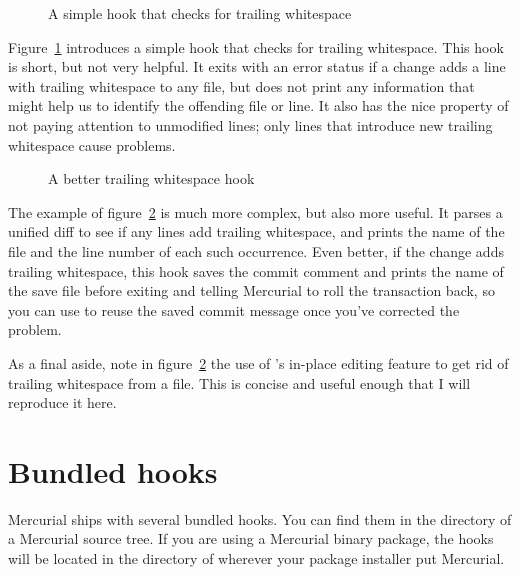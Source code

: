 \begin{figure}[ht]
  \caption{A simple hook that checks for trailing whitespace}
  \label{ex:hook:ws.simple}
\end{figure}

Figure~\ref{ex:hook:ws.simple} introduces a simple 
hook that checks for trailing whitespace.  This hook is short, but not
very helpful.  It exits with an error status if a change adds a line
with trailing whitespace to any file, but does not print any
information that might help us to identify the offending file or
line.  It also has the nice property of not paying attention to
unmodified lines; only lines that introduce new trailing whitespace
cause problems.

\begin{figure}[ht]
  \caption{A better trailing whitespace hook}
  \label{ex:hook:ws.better}
\end{figure}

The example of figure~\ref{ex:hook:ws.better} is much more complex,
but also more useful.  It parses a unified diff to see if any lines
add trailing whitespace, and prints the name of the file and the line
number of each such occurrence.  Even better, if the change adds
trailing whitespace, this hook saves the commit comment and prints the
name of the save file before exiting and telling Mercurial to roll the
transaction back, so you can use
 to reuse the
saved commit message once you've corrected the problem.

As a final aside, note in figure~\ref{ex:hook:ws.better} the use of
's in-place editing feature to get rid of trailing
whitespace from a file.  This is concise and useful enough that I will
reproduce it here.

\section{Bundled hooks}

Mercurial ships with several bundled hooks.  You can find them in the
 directory of a Mercurial source tree.  If you are
using a Mercurial binary package, the hooks will be located in the
 directory of wherever your package installer put
Mercurial.

